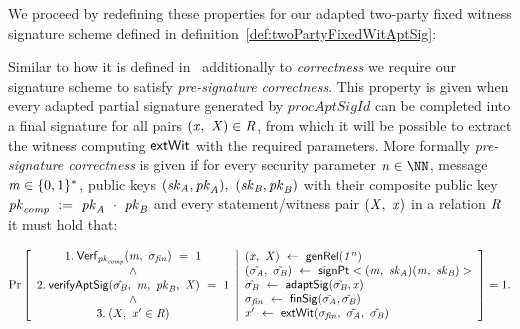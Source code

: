 We proceed by redefining these properties for our adapted two-party fixed witness signature scheme defined in definition~\ref{def:twoPartyFixedWitAptSig}:

\begin{definition}\label{def:preSigCorrectness}
Similar to how it is defined in~\cite{aumayr2020bitcoinchannels} additionally to \textit{correctness} we require our signature scheme to satisfy \textit{pre-signature correctness}.
This property is given when every adapted partial signature generated by $procAptSigId$ can be completed into a final signature for all pairs $(\mathit{x} ,~ \mathit{X}) \in \mathit{R}$, from which it will
be possible to extract the witness computing $\mathsf{extWit}$ with the required parameters.
More formally \textit{pre-signature correctness} is given if for every security parameter $\varN \in \cnstNatural$, message $\mathit{m} \in \{0,1\}^{*}$, public keys $(\mathit{sk}_{\mathit{A}}, \mathit{pk}_{\mathit{A}}) ,~ (\mathit{sk}_{\mathit{B}}, \mathit{pk}_{\mathit{B}})$
with their composite public key $\mathit{pk}_{\mathit{comp}} ~:=~ \mathit{pk}_{\mathit{A}} ~\cdot~ \mathit{pk}_{\mathit{B}}$ and every statement/witness pair $(\mathit{X} ,~ \mathit{x})$ in a relation $\mathit{R}$ it must hold that:
\begin{scriptsize}
    \[
        \Pr\left[
        \begin{array}{c}
            1.\:\mathsf{Verf}_{\mathit{pk}_{\mathit{comp}}}(\mathit{m} ,~ \sigma_{\mathit{fin}}) ~=~ 1 \\
            ~\land~ \\
            2.\: \mathsf{verifyAptSig}(\hat{\sigma_{\mathit{B}}} ,~ \mathit{m} ,~ \mathit{pk}_{\mathit{B}} ,~ \mathit{X}) ~=~ 1 \\
            ~\land~ \\
            3.\:(\mathit{X} ,~ \mathit{x}' \in \mathit{R})
        \end{array}
        \middle\vert
        \begin{array}{l}
            (\mathit{x} ,~ \mathit{X}) ~\leftarrow~ \mathsf{genRel}(\mathit{1^n}) \\
            (\tilde{\sigma_{\mathit{A}}} ,~ \tilde{\sigma_{\mathit{B}}}) ~\leftarrow~ \mathsf{signPt}<(\mathit{m} ,~ \mathit{sk}_{\mathit{A}})(\mathit{m} ,~ \mathit{sk}_{\mathit{B}})> \\
            \hat{\sigma_{\mathit{B}}} ~\leftarrow~ \mathsf{adaptSig}(\tilde{\sigma_{\mathit{B}}},\mathit{x}) \\
            \sigma_{\mathit{fin}} ~\leftarrow~ \mathsf{finSig}(\tilde{\sigma_{\mathit{A}}},\tilde{\sigma_{\mathit{B}}}) \\
            \mathit{x}' ~\leftarrow~ \mathsf{extWit}(\sigma_{\mathit{fin}} ,~ \tilde{\sigma_{\mathit{A}}} ,~ \hat{\sigma_{\mathit{B}}})
        \end{array}
        \right]=1.
    \]
\end{scriptsize}
\end{definition}

